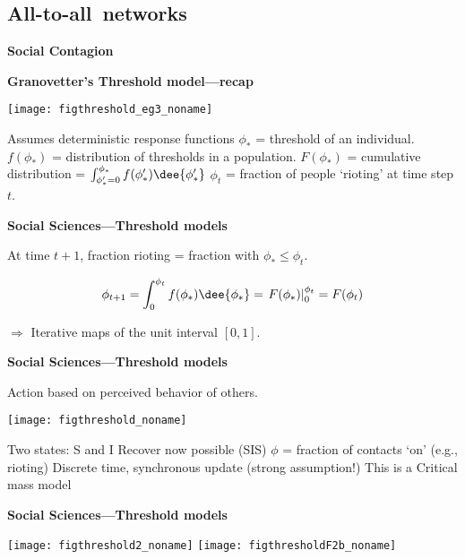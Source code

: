 \subsection{All-to-all\ networks}

  \textbf{Social Contagion}
  
  \textbf{Granovetter's Threshold model---recap}
          
      \texttt{[image: figthreshold\_eg3\_noname]}
      
      
       Assumes deterministic response functions
       $\phi_\ast$ = threshold of an individual.
       $f(\phi_\ast)$ = distribution of thresholds in a population.
       $F(\phi_\ast)$ = cumulative distribution = $\int_{\phi_\ast'=0}^{\phi_\ast} f(\phi_\ast') \dee{\phi_\ast'}$
       $\phi_t$ = fraction of people `rioting' at time step $t$.
      
      
  

  \textbf{Social Sciences---Threshold models}
 
   
   
   At time $t+1$, fraction rioting
   = fraction with $\phi_\ast \le \phi_t$.
   
   \[ \phi_{t+1} = \int_{0}^{\phi_t} f(\phi_\ast) \dee{\phi_\ast}
   = \left. F(\phi_\ast) \right|_{0}^{\phi_t} = F(\phi_t) \]
   
   $\Rightarrow$ Iterative maps of the unit interval $[0, 1]$.
   


  \textbf{Social Sciences---Threshold models}

  Action based on perceived behavior of others.

  \texttt{[image: figthreshold\_noname]}

  
   Two states: S and I
   Recover now possible (SIS)
   $\phi$ = fraction of contacts `on' (e.g., rioting)
   Discrete time, synchronous update (strong assumption!)
   This is a \alert{Critical mass model}
  



  \textbf{Social Sciences---Threshold models}

  \texttt{[image: figthreshold2\_noname]}
  \texttt{[image: figthresholdF2b\_noname]}\\


